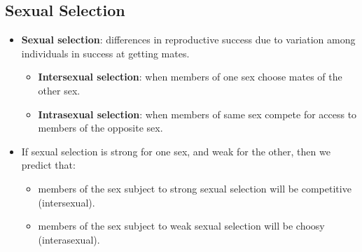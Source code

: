 \documentclass[12pt,a4paper]{article}
\begin{document}
\subsection{Sexual Selection}
\begin{itemize}
    \item \textbf{Sexual selection}: differences in reproductive success due to variation among individuals in success at getting mates.
    \begin{itemize}
        \item \textbf{Intersexual selection}: when members of one sex choose mates of the other sex.
        \item \textbf{Intrasexual selection}: when members of same sex compete for access to members of the opposite sex.
    \end{itemize}
    \item If sexual selection is strong for one sex, and weak for the other, then we predict that:
    \begin{itemize}
        \item members of the sex subject to strong sexual selection will be competitive (intersexual).
        \item members of the sex subject to weak sexual selection will be choosy (interasexual).
    \end{itemize}

\end{itemize}
\end{document}

